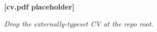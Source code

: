 \cleardoublepage
\thispagestyle{empty}
\null\vfill
\begin{center}
  {\Huge\bfseries [cv.pdf placeholder]}\par
  \vspace{1em}
  {\normalsize\itshape Drop the externally-typeset CV at the repo root.}
\end{center}
\vfill\clearpage
